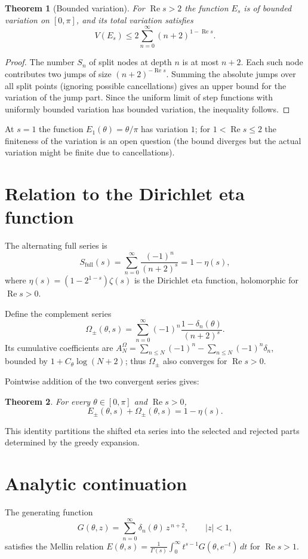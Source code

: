 \documentclass[11pt,a4paper]{article}
\newtheorem{theorem}{Theorem}[section]
\theoremstyle{definition}
\theoremstyle{remark}
\begin{document}
\begin{theorem}[Bounded variation]\label{thm:BV}
For \(\operatorname{Re}s>2\) the function \(E_s\) is of bounded variation on \([0,\pi]\), and its total variation satisfies
\[
V(E_s) \le 2\sum_{n=0}^{\infty} (n+2)^{1-\operatorname{Re}s}.
\]
\end{theorem}
\begin{proof}
The number \(S_n\) of split nodes at depth \(n\) is at most \(n+2\).  Each such node contributes two jumps of size \((n+2)^{-\operatorname{Re}s}\).
Summing the absolute jumps over all split points (ignoring possible cancellations) gives an upper bound for the variation of the jump part.  Since the uniform limit of step functions with uniformly bounded variation has bounded variation, the inequality follows.
\end{proof}

At \(s=1\) the function \(E_1(\theta)=\theta/\pi\) has variation \(1\); for \(1<\operatorname{Re}s\le 2\) the finiteness of the variation is an open question (the bound diverges but the actual variation might be finite due to cancellations).

\section{Relation to the Dirichlet eta function}
The alternating full series is
\[
S_{\text{full}}(s) = \sum_{n=0}^{\infty}\frac{(-1)^n}{(n+2)^s} = 1 - \eta(s),
\]
where \(\eta(s)=(1-2^{1-s})\zeta(s)\) is the Dirichlet eta function, holomorphic for \(\operatorname{Re}s>0\).

Define the complement series
\[
\Omega_{\pm}(\theta,s) = \sum_{n=0}^{\infty} (-1)^n\frac{1-\delta_n(\theta)}{(n+2)^s}.
\]
Its cumulative coefficients are \(A^{\Omega}_N = \sum_{n\le N}(-1)^n - \sum_{n\le N}(-1)^n\delta_n\), bounded by \(1+C_\theta\log(N+2)\); thus \(\Omega_{\pm}\) also converges for \(\operatorname{Re}s>0\).

Pointwise addition of the two convergent series gives:

\begin{theorem}\label{thm:eta}
For every \(\theta\in[0,\pi]\) and \(\operatorname{Re}s>0\),
\[
E_{\pm}(\theta,s) + \Omega_{\pm}(\theta,s) = 1 - \eta(s).
\]
\end{theorem}

This identity partitions the shifted eta series into the selected and rejected parts determined by the greedy expansion.

\section{Analytic continuation}
The generating function
\[
G(\theta,z) = \sum_{n=0}^{\infty} \delta_n(\theta)\, z^{\,n+2},\qquad |z|<1,
\]
satisfies the Mellin relation \(E(\theta,s) = \frac{1}{\Gamma(s)}\int_0^\infty t^{s-1}G(\theta,e^{-t})\,dt\) for \(\operatorname{Re}s>1\).
\end{document}
